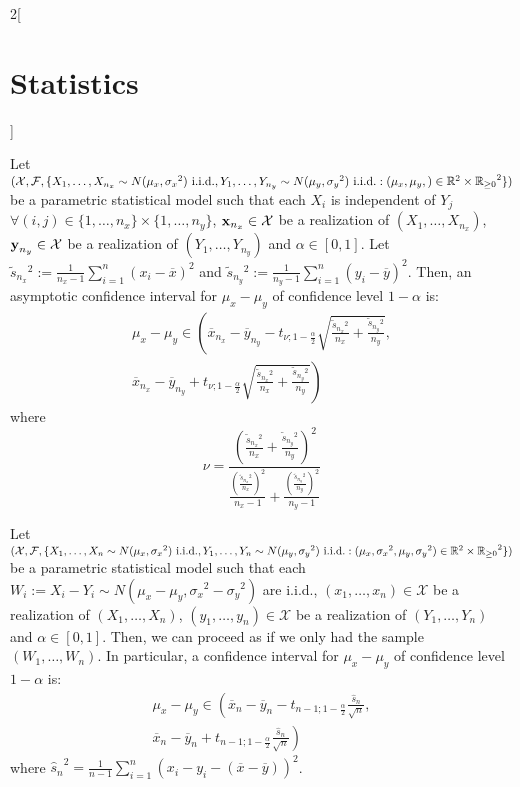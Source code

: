 \documentclass[../../../main_math.tex]{subfiles}
\begin{document}
\begin{multicols}{2}[\section{Statistics}]
\begin{proposition}
  \end{proposition}
  \begin{proposition}
    Let $(\mathcal{X},\mathcal{F},\{X_1,\ldots,X_{n_x}\sim N(\mu_x,{\sigma_x}^2)\text{ i.i.d.},Y_1,\ldots,Y_{n_y}\sim N(\mu_y,{\sigma_y}^2)\text{ i.i.d.}:(\mu_x,\mu_y,)\in\mathbb{R}^2\times{\ensuremath{\mathbb{R}}_{\geq 0}}^2\})$ be a parametric statistical model such that each $X_i$ is independent of $Y_j$ $\forall (i,j)\in\{1,\ldots,n_x\}\times\{1,\ldots,n_y\}$, $\boldsymbol{\mathrm{x}}_{n_x}\in\mathcal{X}$ be a realization of $(X_1,\ldots,X_{n_x})$, $\boldsymbol{\mathrm{y}}_{n_y}\in\mathcal{X}$ be a realization of $(Y_1,\ldots,Y_{n_y})$ and $\alpha\in[0,1]$. Let $\tilde{s}_{n_x}{}^2:=\frac{1}{n_x-1}\sum_{i=1}^n{(x_i-\overline{x})}^2$ and $\tilde{s}_{n_y}{}^2:=\frac{1}{n_y-1}\sum_{i=1}^n{(y_i-\overline{y})}^2$. Then, an asymptotic confidence interval for $\mu_x-\mu_y$ of confidence level $1-\alpha$ is:
    \begin{multline*}
      \mu_x-\mu_y\in\left(\overline{x}_{n_x}-\overline{y}_{n_y}-t_{\nu;1-\frac{\alpha}{2}}\sqrt{\frac{\tilde{s}_{n_x}{}^2}{n_x}+\frac{\tilde{s}_{n_y}{}^2}{n_y}},\right.\\\left.\overline{x}_{n_x}-\overline{y}_{n_y}+t_{\nu;1-\frac{\alpha}{2}}\sqrt{\frac{\tilde{s}_{n_x}{}^2}{n_x}+\frac{\tilde{s}_{n_y}{}^2}{n_y}}\right)
    \end{multline*}
    where $$\nu=\frac{\displaystyle{\left(\frac{\tilde{s}_{n_x}{}^2}{n_x}+\frac{\tilde{s}_{n_y}{}^2}{n_y}\right)}^2}{\displaystyle\frac{{\left(\frac{\tilde{s}_{n_x}{}^2}{n_x}\right)}^2}{n_x-1}+\frac{{\left(\frac{\tilde{s}_{n_y}{}^2}{n_y}\right)}^2}{n_y-1}}$$
  \end{proposition}
  \begin{proposition}
    Let $(\mathcal{X},\mathcal{F},\{X_1,\ldots,X_{n}\sim N(\mu_x,{\sigma_x}^2)\text{ i.i.d.},Y_1,\ldots,Y_{n}\sim N(\mu_y,{\sigma_y}^2)\text{ i.i.d.}:(\mu_x,{\sigma_x}^2,\mu_y,{\sigma_y}^2)\in\mathbb{R}^2\times{\ensuremath{\mathbb{R}}_{\geq 0}}^2\})$ be a parametric statistical model such that each $W_i:=X_i-Y_i\sim N(\mu_x-\mu_y,{\sigma_x}^2-{\sigma_y}^2)$ are i.i.d., $(x_1,\ldots,x_n)\in\mathcal{X}$ be a realization of $(X_1,\ldots,X_{n})$, $(y_1,\ldots,y_n)\in\mathcal{X}$ be a realization of $(Y_1,\ldots,Y_{n})$ and $\alpha\in[0,1]$. Then, we can proceed as if we only had the sample $(W_1,\ldots,W_n)$. In particular, a confidence interval for $\mu_x-\mu_y$ of confidence level $1-\alpha$ is:
    \begin{multline*}
      \mu_x-\mu_y\in\left(\overline{x}_{n}-\overline{y}_{n}-t_{n-1;1-\frac{\alpha}{2}}\frac{\hat{s}_n}{\sqrt{n}},\right.\\\left.\overline{x}_{n}-\overline{y}_{n}+t_{n-1;1-\frac{\alpha}{2}}\frac{\hat{s}_n}{\sqrt{n}}\right)
    \end{multline*}
    where ${\hat{s}_n}^2=\frac{1}{n-1}\sum_{i=1}^n{(x_i-y_i-(\overline{x}-\overline{y}))}^2$.
  \end{proposition}

\end{multicols}
\end{document}
